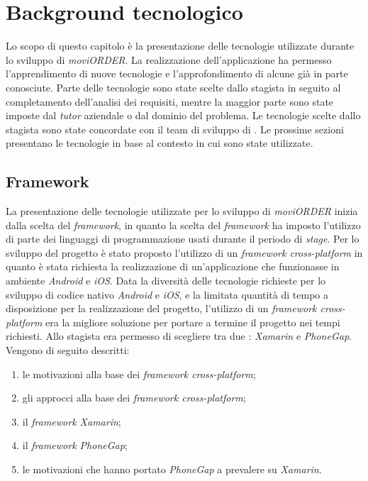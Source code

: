 
\chapter{Background tecnologico} \label{background}

Lo scopo di questo capitolo è la presentazione delle tecnologie utilizzate durante lo sviluppo di \textit{moviORDER}. La realizzazione dell'applicazione ha permesso l'apprendimento di nuove tecnologie e l'approfondimento di alcune già in parte conosciute. Parte delle tecnologie sono state scelte dallo stagista in seguito al completamento dell'analisi dei requisiti, mentre la maggior parte sono state imposte dal \textit{tutor} aziendale o dal dominio del problema. Le tecnologie scelte dallo stagista sono state concordate con il team di sviluppo di \visione{}. Le prossime sezioni presentano le tecnologie in base al contesto in cui sono state utilizzate.

\section{Framework}	

La presentazione delle tecnologie utilizzate per lo sviluppo di \textit{moviORDER} inizia dalla scelta del \textit{framework}, in quanto la scelta del \textit{framework} ha imposto l'utilizzo di parte dei linguaggi di programmazione usati durante il periodo di \textit{stage}. Per lo sviluppo del progetto è stato proposto l'utilizzo di un \textit{framework cross-platform} in quanto è stata richiesta la realizzazione di un'applicazione che funzionasse in ambiente \textit{Android} e \textit{iOS}. Data la diversità delle tecnologie richieste per lo sviluppo di codice nativo \textit{Android} e \textit{iOS}, e la limitata quantità di tempo a disposizione per la realizzazione del progetto, l'utilizzo di un \textit{framework cross-platform} era la migliore soluzione per portare a termine il progetto nei tempi richiesti. Allo stagista era permesso di scegliere tra due : \textit{Xamarin} e \textit{PhoneGap}.\\ Vengono di seguito descritti:
\begin{enumerate}
	\item le motivazioni alla base dei \textit{framework cross-platform};
	\item gli approcci alla base dei \textit{framework cross-platform};
	\item il \textit{framework Xamarin};
	\item il \textit{framework PhoneGap};
	\item le motivazioni che hanno portato \textit{PhoneGap} a prevalere su \textit{Xamarin}.
\end{enumerate}


